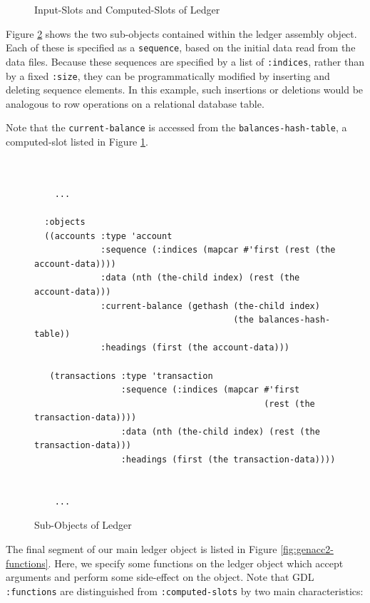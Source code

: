 \documentclass [11pt]{book}
\begin{document}
\begin{figure}
\begin{lrbox}{\boxedverb}
\begin{minipage}{\linewidth}
\small{}
\end{minipage}
\end{lrbox}
\fbox{\usebox{\boxedverb}}

\caption{Input-Slots and Computed-Slots of Ledger}

\label{code:ledger-input-computed}

\end{figure}
Figure 
\ref{fig:genacc2-subobjects} shows the two sub-objects contained within the ledger assembly object. Each of these
is specified as a \texttt{sequence}, based on the initial data read from the data files. Because these sequences are specified
by a list of \texttt{:indices}, rather than by a fixed \texttt{:size}, they can be programmatically modified by inserting and deleting sequence elements. In 
this example, such insertions or deletions would be analogous to row operations on a relational
database table. 

Note that the \texttt{current-balance} is accessed from the \texttt{balances-hash-table}, a computed-slot listed in Figure 
\ref{code:ledger-input-computed}.
\begin{figure}
\begin{lrbox}{\boxedverb}
\begin{minipage}{\linewidth}
\small{

\begin{verbatim}


    ...
       
  :objects
  ((accounts :type 'account
             :sequence (:indices (mapcar #'first (rest (the account-data))))
             :data (nth (the-child index) (rest (the account-data)))
             :current-balance (gethash (the-child index) 
                                       (the balances-hash-table))
             :headings (first (the account-data)))
   
   (transactions :type 'transaction
                 :sequence (:indices (mapcar #'first 
                                             (rest (the transaction-data))))
                 :data (nth (the-child index) (rest (the transaction-data)))
                 :headings (first (the transaction-data))))
  

    ...

\end{verbatim}}
\end{minipage}
\end{lrbox}
\fbox{\usebox{\boxedverb}}

\caption{Sub-Objects of Ledger}

\label{fig:genacc2-subobjects}

\end{figure}
The final segment of our main ledger object is listed in Figure 
\ref{fig:genacc2-functions}. Here, we specify some functions on the ledger object which accept
arguments and perform some side-effect on the object. Note that GDL \texttt{:functions} are distinguished from \texttt{:computed-slots} by two main characteristics:
\end{document}
